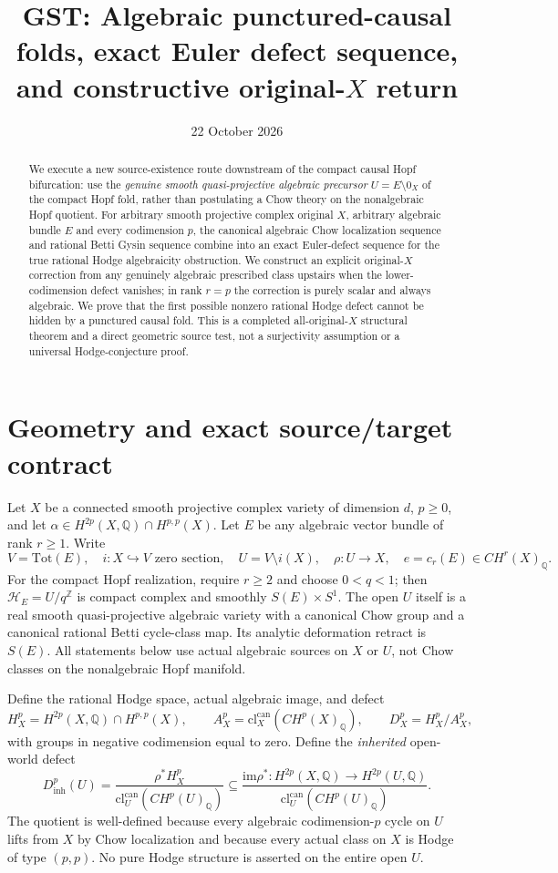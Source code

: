 \documentclass[11pt]{article}
\title{GST: Algebraic punctured-causal folds, exact Euler defect sequence,
and constructive original-$X$ return}
\date{22 October 2026}
\begin{document}
\maketitle

\begin{abstract}
We execute a new source-existence route downstream of the compact causal
Hopf bifurcation: use the \emph{genuine smooth quasi-projective algebraic
precursor} $U=E\setminus0_X$ of the compact Hopf fold, rather than
postulating a Chow theory on the nonalgebraic Hopf quotient.
For arbitrary smooth projective complex original $X$, arbitrary algebraic
bundle $E$ and every codimension $p$, the canonical algebraic Chow
localization sequence and rational Betti Gysin sequence combine into an
exact Euler-defect sequence for the true rational Hodge algebraicity
obstruction. We construct an explicit original-$X$ correction from any
genuinely algebraic prescribed class upstairs when the lower-codimension
defect vanishes; in rank $r=p$ the correction is purely scalar and always
algebraic. We prove that the first possible nonzero rational Hodge defect
cannot be hidden by a punctured causal fold. This is a completed
all-original-$X$ structural theorem and a direct geometric source test,
not a surjectivity assumption or a universal Hodge-conjecture proof.
\end{abstract}

\section{Geometry and exact source/target contract}
Let $X$ be a connected smooth projective complex variety of dimension
$d$, $p\ge0$, and let $\alpha\in H^{2p}(X,\mathbb Q)\cap H^{p,p}(X)$.
Let $E$ be any algebraic vector bundle of rank $r\ge1$. Write
\[
 V=\mathrm{Tot}(E),\quad i:X\hookrightarrow V\text{ zero section},
 \quad U=V\setminus i(X),\quad
 \rho:U\longrightarrow X,\quad
 e=c_r(E)\in CH^r(X)_{\mathbb Q}.
\]
For the compact Hopf realization, require $r\ge2$ and choose
$0<q<1$; then $\mathcal H_E=U/q^{\mathbb Z}$
is compact complex and smoothly $S(E)\times S^1$.
The open $U$ itself is a real smooth quasi-projective algebraic
variety with a canonical Chow group and a canonical rational
Betti cycle-class map. Its analytic deformation retract is
$S(E)$. All statements below use actual algebraic sources on
$X$ or $U$, not Chow classes on the nonalgebraic Hopf manifold.

Define the rational Hodge space, actual algebraic image, and defect
\[
 H_X^p=H^{2p}(X,\mathbb Q)\cap H^{p,p}(X),\qquad
 A_X^p=\mathrm{cl}^{\mathrm{can}}_X(CH^p(X)_{\mathbb Q}),
 \qquad D_X^p=H_X^p/A_X^p,
\]
with groups in negative codimension equal to zero. Define the
\emph{inherited} open-world defect
\[
 D^p_{\mathrm{inh}}(U)
 =
 \frac{\rho^*H_X^p}
      {\mathrm{cl}^{\mathrm{can}}_U(CH^p(U)_{\mathbb Q})}
 \subseteq
 \frac{\mathrm{im}\rho^*:H^{2p}(X,\mathbb Q)\to
                 H^{2p}(U,\mathbb Q)}
      {\mathrm{cl}^{\mathrm{can}}_U(CH^p(U)_{\mathbb Q})}.
 \tag{1}
\]
The quotient is well-defined because every algebraic codimension-$p$
cycle on $U$ lifts from $X$ by Chow localization and because
every actual class on $X$ is Hodge of type $(p,p)$.
No pure Hodge structure is asserted on the entire open $U$.
\end{document}
